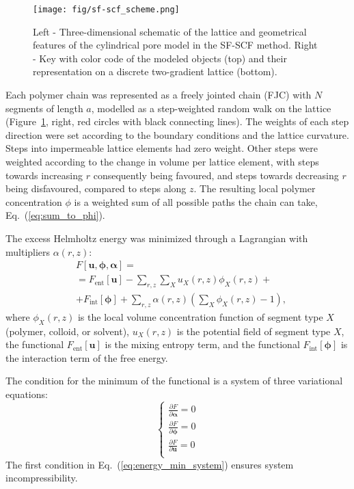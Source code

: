 \documentclass[10pt, a4paper]{article}
\begin{document}
\begin{multicols}{2}
\begin{figure}[H]
    \centering
    \texttt{[image: fig/sf-scf\_scheme.png]}
    \caption{
    Left - Three-dimensional schematic of the lattice and geometrical features of the cylindrical pore model in the SF-SCF method.
    Right - Key with color code of the modeled objects (top) and their representation on a discrete two-gradient lattice (bottom).
    }
    \label{fig:sf-scf_scheme}
\end{figure}

Each polymer chain was represented as a freely jointed chain (FJC) with $N$ segments of length $a$, modelled as a step-weighted random walk on the lattice (Figure~\ref{fig:sf-scf_scheme}, right, red circles with black connecting lines).
The weights of each step direction were set according to the boundary conditions and the lattice curvature.
Steps into impermeable lattice elements had zero weight.
Other steps were weighted according to the change in volume per lattice element, with steps towards increasing $r$ consequently being favoured, and steps towards decreasing $r$ being disfavoured, compared to steps along $z$.
The resulting local polymer concentration $\phi$ is a weighted sum of all possible paths the chain can take, Eq.~(\ref{eq:sum_to_phi}).

The excess Helmholtz energy was minimized through a Lagrangian with multipliers $\alpha(r,z)$:
\begin{equation}
    \label{eq:fe_lagrangian}
    \begin{aligned}
        &F[\mathbf{u}, \boldsymbol{\phi}, \boldsymbol{\alpha}] =\\
        &= F_{\text{ent}}[\mathbf{u}] - \sum\limits_{r,z} \sum\limits_X u_X(r, z) \phi_X(r, z) + \\
        &+ F_{\text{int}} [\boldsymbol{\phi}] 
        + \sum\limits_{r,z} \alpha(r, z) \left( \sum\limits_X \phi_X(r, z) - 1 \right),
    \end{aligned} 
\end{equation}
where $\phi_X(r,z)$ is the local volume concentration function of segment type $X$ (polymer, colloid, or solvent), $u_X(r, z)$ is the potential field of segment type $X$, the functional $F_{\text{ent}}[\mathbf{u}]$ is the mixing entropy term, and the functional $F_{\text{int}} [\boldsymbol{\phi}]$ is the interaction term of the free energy.

The condition for the minimum of the functional is a system of three variational equations:
\begin{equation}
    \label{eq:energy_min_system}
    \begin{cases}
        \frac{\partial F}{\partial \boldsymbol{\alpha}} = 0 \\
        \frac{\partial F}{\partial \boldsymbol{\phi}} = 0 \\
        \frac{\partial F}{\partial \mathbf{u}} = 0 \\
    \end{cases}
\end{equation}
The first condition in Eq.~(\ref{eq:energy_min_system}) ensures system incompressibility.


\end{multicols}
\end{document}

